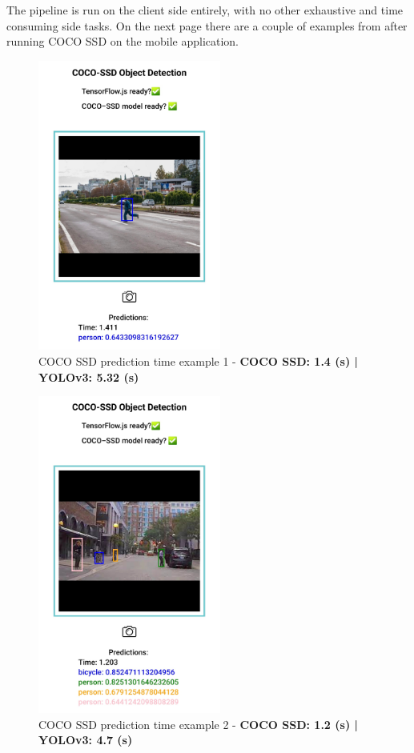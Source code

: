 \documentclass[runningheads,a4paper,11pt]{report}
\begin{document}
The pipeline is run on the client side entirely, with no other exhaustive and time consuming side tasks. On the next page there are a couple of examples from after running COCO SSD on the mobile application.
\begin{figure}
\centering
\includegraphics[width=6cm]{images/screenshot2.jpg}
\caption{COCO SSD prediction time example 1 - \textbf{COCO SSD: 1.4 (s) | YOLOv3: 5.32 (s)}}\label{fig:cocoyolo1}
\end{figure}

\begin{figure}
\centering
\includegraphics[width=6cm]{images/screenshot3.jpg}
\caption{COCO SSD prediction time example 2 - \textbf{COCO SSD: 1.2 (s) | YOLOv3: 4.7 (s)}}\label{fig:ex2}
\end{figure}
\end{document}
